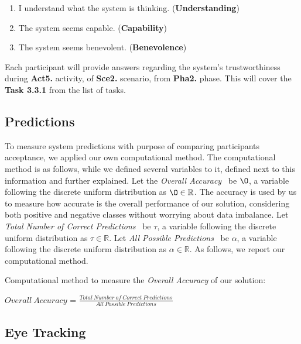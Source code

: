 \begin{enumerate}
\item I understand what the system is thinking. ({\bf Understanding})
\item The system seems capable. ({\bf Capability})
\item The system seems benevolent. ({\bf Benevolence})
\end{enumerate}

Each participant will provide answers regarding the system's trustworthiness during {\bf Act5.} activity, of {\bf Sce2.} scenario, from {\bf Pha2.} phase.
This will cover the {\bf Task 3.3.1} from the list of tasks.

\subsection{Predictions}

To measure system predictions with purpose of comparing participants acceptance, we applied our own computational method.
The computational method is as follows, while we defined several variables to it, defined next to this information and further explained.
Let the {\it Overall Accuracy}~\cite{ashraf2018comparative, li2018digital} be $\O$, a variable following the discrete uniform distribution as $\O \in \mathbb{R}$. The accuracy is used by us to measure how accurate is the overall performance of our solution, considering both positive and negative classes without worrying about data imbalance. Let {\it Total Number of Correct Predictions}~\cite{ashraf2018comparative, li2018digital} be $\tau$, a variable following the discrete uniform distribution as $\tau \in \mathbb{R}$.
Let {\it All Possible Predictions}~\cite{ashraf2018comparative, li2018digital} be $\alpha$, a variable following the discrete uniform distribution as $\alpha \in \mathbb{R}$. As follows, we report our computational method.

\hfill

Computational method to measure the {\it Overall Accuracy} of our solution:

\begin{Form}
\large
\begin{center}
$Overall~Accuracy$ = $\frac{Total~Number~of~Correct~Predictions}{All~Possible~Predictions}$
\end{center}
\end{Form}

\subsection{Eye Tracking}

